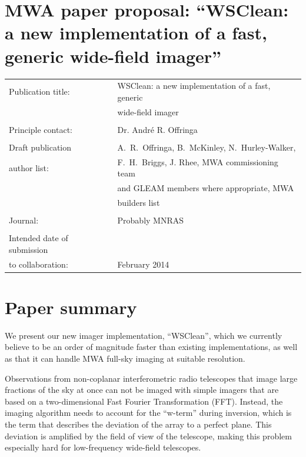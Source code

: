 \documentclass[a4paper,10pt]{article}
\begin{document}
\label{firstpage}
\section*{MWA paper proposal: ``WSClean: a new implementation of a fast, generic wide-field imager''}
\begin{tabular}{ll}
Publication title: & WSClean: a new implementation of a fast, generic \\
                   & wide-field imager\\
                   & \\
Principle contact: & Dr. Andr\'e R. Offringa \\
                   & \\
Draft publication        & A.~R.~Offringa, B.~McKinley, N.~Hurley-Walker, \\
\hspace{5mm}author list: & F.~H.~Briggs, J. Rhee, MWA commissioning team \\
                         & and GLEAM members where appropriate, MWA \\
                         & builders list \\
                   & \\
Journal:           & Probably MNRAS\\
                   & \\
Intended date of submission\\
\hspace{5mm}to collaboration: & February 2014\\
\end{tabular}

\section*{Paper summary}
We present our new imager implementation, ``WSClean'', which we currently believe to be an order of magnitude faster than existing implementations, as well as that it can handle MWA full-sky imaging at suitable resolution.

Observations from non-coplanar interferometric radio telescopes that image large fractions of the sky at once can not be imaged with simple imagers that are based on a two-dimensional Fast Fourier Transformation (FFT). Instead, the imaging algorithm needs to account for the ``w-term'' during inversion, which is the term that describes the deviation of the array to a perfect plane. This deviation is amplified by the field of view of the telescope, making this problem especially hard for low-frequency wide-field telescopes.
\end{document}
